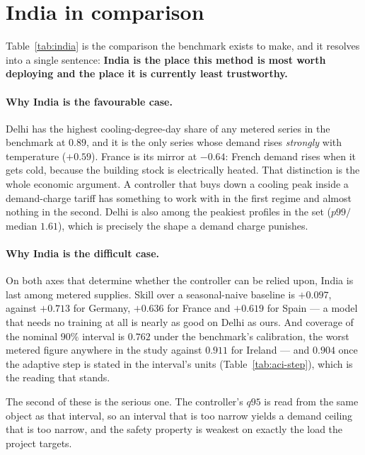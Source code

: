\section{India in comparison}
\label{sec:india}



Table~\ref{tab:india} is the comparison the benchmark exists to make, and it
resolves into a single sentence: \textbf{India is the place this method is most
worth deploying and the place it is currently least trustworthy.}

\paragraph{Why India is the favourable case.} Delhi has the highest
cooling-degree-day share of any metered series in the benchmark at $0.89$, and
it is the only series whose demand rises \emph{strongly} with temperature
($+0.59$). France is its mirror at $-0.64$: French demand rises when it gets
cold, because the building stock is electrically heated. That distinction is the
whole economic argument. A controller that buys down a cooling peak inside a
demand-charge tariff has something to work with in the first regime and almost
nothing in the second. Delhi is also among the peakiest profiles in the set
($p99/$median $1.61$), which is precisely the shape a demand charge punishes.

\paragraph{Why India is the difficult case.} On both axes that determine whether
the controller can be relied upon, India is last among metered supplies. Skill
over a seasonal-naive baseline is $+0.097$, against $+0.713$ for Germany,
$+0.636$ for France and $+0.619$ for Spain --- a model that needs no training at
all is nearly as good on Delhi as ours. And coverage of the nominal $90\%$
interval is $0.762$ under the benchmark's calibration, the worst metered figure
anywhere in the study against $0.911$ for Ireland --- and $0.904$ once the
adaptive step is stated in the interval's units (Table~\ref{tab:aci-step}),
which is the reading that stands.

The second of these is the serious one. The controller's $q95$ is read from the
same object as that interval, so an interval that is too narrow yields a demand
ceiling that is too narrow, and the safety property is weakest on exactly the
load the project targets.


